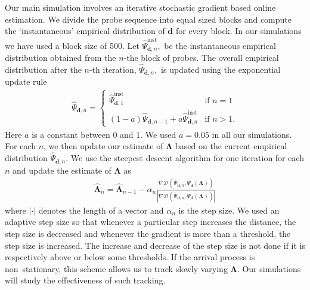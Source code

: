 \documentclass[11pt]{article}
\begin{document}
Our main simulation involves an iterative stochastic gradient based
online estimation. We divide the probe sequence into equal sized
blocks and compute the `instantaneous' empirical distribution of
$\mathbf{d}$ for every block. In our simulations we have used a block
size of 500. Let $\hat{\Psi}^{\mathrm{inst}}_{\mathbf{d},n},$ be the
instantaneous empirical distribution obtained from the $n$-the block
of probes. The overall empirical distribution after the $n$-th
iteration, $\hat{\Psi}_{\mathbf{d},n},$ is updated using the
exponential update rule
\begin{eqnarray}
  \hat{\Psi}_{\mathbf{d},n} = 
  \begin{cases} 
    \hat{\Psi}^{\mathrm{inst}}_{\mathbf{d},1}& \text{if $n=1$} \\
    (1-a) \hat{\Psi}_{\mathbf{d},n-1} + a
    \hat{\Psi}^{\mathrm{inst}}_{\mathbf{d},n}  & \text{if $n>1$} .
  \end{cases}
  \label{update}
\end{eqnarray}
Here $a$ is a constant between $0$ and $1$. We used $a=0.05$ in all
our simulations. For each $n$, we then update our estimate of
$\mathbf{\Lambda}$ based on the current empirical distribution
$\hat{\Psi}_{\mathbf{d},n}$. We use the steepest descent algorithm for
one iteration for each $n$ and update the estimate of
$\mathbf{\Lambda}$ as
\begin{eqnarray}
  \hat{\mathbf{\Lambda}}_n = \hat{\mathbf{\Lambda}}_{n-1} -
  \alpha_n \frac{\nabla \mathcal{D}\left( \hat{\Psi}_{\mathbf{d},n},
      \Psi_\mathbf{d} (\mathbf{\Lambda}) \right) }{   
    \left| \nabla \mathcal{D}\left( \hat{\Psi}_{\mathbf{d},n} , \Psi_\mathbf{d}
        (\mathbf{\Lambda}) \right) \right| } 
  \nonumber
\end{eqnarray}
where $|\cdot|$ denotes the length of a vector and $\alpha_n$ is the
step size.  We used an adaptive step size so that whenever a
particular step increases the distance, the step size is decreased and
whenever the gradient is more than a threshold, the step size is
increased. The increase and decrease of the step size is not done if
it is respectively above or below some thresholds.  
If the arrival process is non~stationary, this scheme allows us to
track slowly varying $\mathbf{\Lambda}.$ Our simulations will study
the effectiveness of such tracking.
\end{document}
